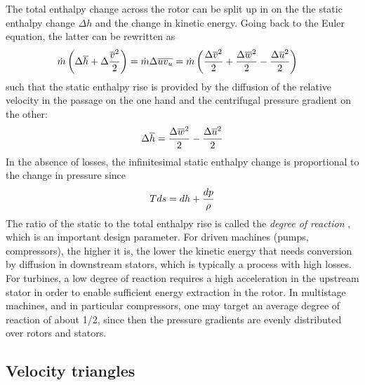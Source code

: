 The total enthalpy change across the rotor can be split up in on the
the static enthalpy change $\Delta h$ and the change in kinetic
energy. Going back to the Euler equation, the latter can be rewritten as
\begin{align*}
  \dot m \left(
    \Delta \overline {h} + 
    \Delta \frac{\overline {v}^2}{2}\right)
  &= \dot m \Delta \overline{u v_{u}} = \dot m \left(
    \frac{\Delta \overline {v}^2}{2} + 
    \frac{\Delta \overline {w}^2}{2} - 
    \frac{\Delta \overline {u}^2}{2}\right)
\end{align*}
such that the static enthalpy rise is provided by the diffusion of the
relative velocity in the passage on the one hand and the centrifugal
pressure gradient on the other:
\begin{equation}
  \Delta \overline {h} = 
    \frac{\Delta \overline {w}^2}{2} - 
    \frac{\Delta \overline {u}^2}{2}
\end{equation}
In the absence of losses, the infinitesimal static enthalpy change is
proportional to the change in pressure since
\begin{align*}
  T d s = dh + \frac{dp}{\rho}
\end{align*}
The ratio of the static to the total enthalpy rise is called the
\emph{degree of reaction} \reaction, which is an important design
parameter. For driven machines (pumps, compressors), the higher it is,
the lower the kinetic energy that needs conversion by diffusion in
downstream stators, which is typically a process with high losses. For
turbines, a low degree of reaction requires a high acceleration in the
upstream stator in order to enable sufficient energy extraction in the
rotor. In multistage machines, and in particular compressors, one may
target an average degree of reaction of about 1/2, since then the
pressure gradients are evenly distributed over rotors and stators. 

\subsection{Velocity triangles}

